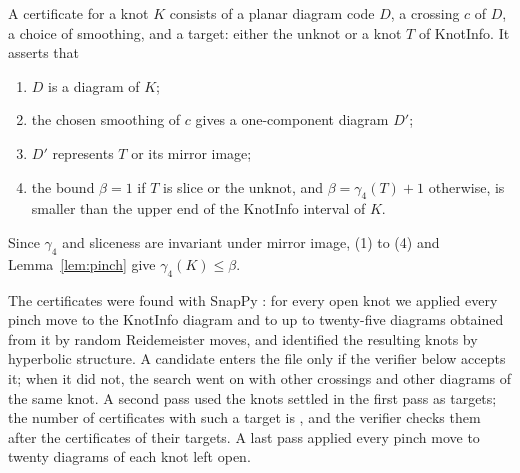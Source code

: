 \documentclass[11pt]{amsart}
\theoremstyle{definition}
\theoremstyle{remark}
\numberwithin{equation}{section}
\begin{document}
A certificate for a knot $K$ consists of a planar diagram code $D$, a crossing $c$ of $D$, a
choice of smoothing, and a target: either the unknot or a knot $T$ of KnotInfo. It asserts
that
\begin{enumerate}
\item $D$ is a diagram of $K$;
\item the chosen smoothing of $c$ gives a one-component diagram $D'$;
\item $D'$ represents $T$ or its mirror image;
\item the bound $\beta=1$ if $T$ is slice or the unknot, and $\beta=\gamma_4(T)+1$ otherwise,
is smaller than the upper end of the KnotInfo interval of $K$.
\end{enumerate}
Since $\gamma_4$ and sliceness are invariant under mirror image, (1) to (4) and
Lemma~\ref{lem:pinch} give $\gamma_4(K)\le\beta$.

The certificates were found with SnapPy \cite{SnapPy}: for every open knot we applied
every pinch move to the KnotInfo diagram and to up to twenty-five diagrams obtained from it
by random Reidemeister moves, and identified the resulting knots by hyperbolic structure. A
candidate enters the file only if the verifier below accepts it; when it did not, the search
went on with other crossings and other diagrams of the same knot. A second pass used the
knots settled in the first pass as targets; the number of certificates with such a target
is \nchained{}, and the verifier checks them after the certificates of their targets. A last
pass applied every pinch move to twenty diagrams of each knot left open.
\end{document}
